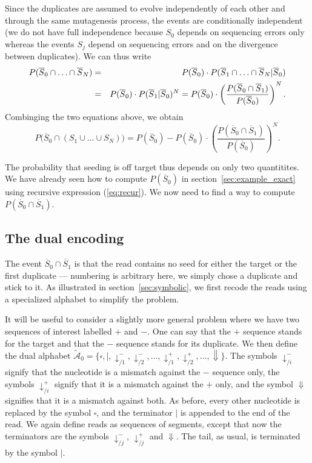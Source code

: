 \documentclass{article}
\begin{document}
Since the duplicates are assumed to evolve independently of each other and
through the same mutagenesis process, the events are conditionally
independent (we do not have full independence because $S_0$ depends on
sequencing errors only whereas the events $S_j$ depend on sequencing
errors and on the divergence between duplicates). We can thus write
\begin{eqnarray}
\notag
P(\overline{S}_0 \cap \ldots \cap \overline{S}_N) &=&
  P(\overline{S}_0) \cdot P(\overline{S}_1 \cap \ldots \cap
  \overline{S}_N | \overline{S}_0) \\
\label{eq:Pnull}
  &=& P(\overline{S}_0) \cdot P(\overline{S}_1 | \overline{S}_0)^N =
  P(\overline{S}_0) \cdot \left( \frac{P(\overline{S}_0 \cap
\overline{S}_1)}{P(\overline{S}_0)} \right)^N.
\end{eqnarray}
Combinging the two equations above, we obtain
\begin{equation}
\label{eq:Poff}
P\big(\overline{S}_0 \cap (S_1 \cup \ldots \cup S_N)\big) =
P(\overline{S}_0) - P(\overline{S}_0) \cdot \left( \frac{P(\overline{S}_0
\cap \overline{S}_1)}{P(\overline{S}_0)} \right)^N.
\end{equation}

The probability that seeding is off target thus depends on only two
quantitites. We have already seen how to compute $P(\overline{S}_0)$ in
section~\ref{sec:example_exact} using recursive expression
(\ref{eq:recur}). We now need to find a way to compute $P(\overline{S}_0
\cap \overline{S}_1)$.

\subsection{The dual encoding}
\label{sec:dual}

The event $\overline{S}_0 \cap \overline{S}_1$ is that the read contains
no seed for either the target or the first duplicate --- numbering is
arbitrary here, we simply chose a duplicate and stick to it.
As illustrated in section~\ref{sec:symbolic}, we first recode the reads
using a specialized alphabet to simplify the problem.

It will be useful to consider a slightly more general problem where we
have two sequences of interest labelled $+$ and $-$. One can say that the
$+$ sequence stands for the target and that the $-$ sequence stands for
its duplicate. We then define the dual alphabet $\tilde{\mathcal{A}}_0 =
\{\square, |, \downarrow_{/1}^-, \downarrow_{/2}^-, \ldots,
\downarrow_{/1}^+, \downarrow_{/2}^+, \ldots, \Downarrow\}$. The symbols
$\downarrow_{/i}^-$ signify that the nucleotide is a mismatch against the
$-$ sequence only, the symbols $\downarrow_{/i}^+$ signify that it is a
mismatch against the $+$ only, and the symbol $\Downarrow$ signifies that
it is a mismatch against both. As before, every other nucleotide is
replaced by the symbol $\square$, and the terminator $|$ is appended to
the end of the read. We again define reads as sequences of segments,
except that now the terminators are the symbols $\downarrow_{/j}^-$,
$\downarrow_{/j}^+$ and $\Downarrow$. The tail, as usual, is terminated by
the symbol $|$.
\end{document}
